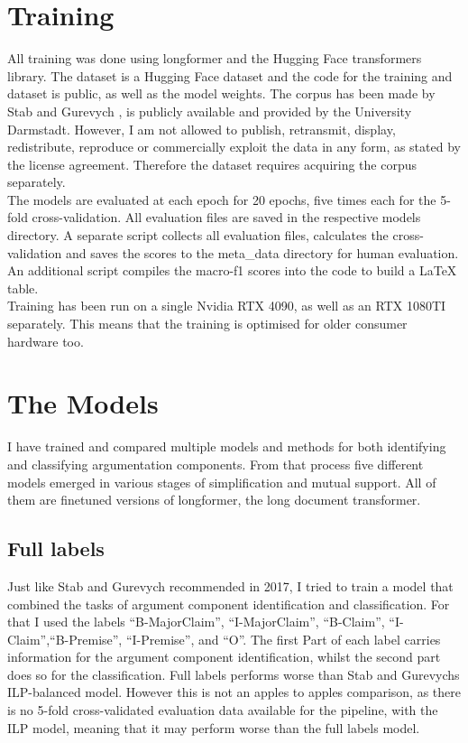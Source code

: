 \documentclass[12]{article}
\theoremstyle{mytheoremstyle}
\theoremstyle{mytheoremstyle}
\theoremstyle{myproblemstyle}
\begin{document}
  \section{Training\dotfill}
  All training was done using longformer\cite{beltagy2020longformer} and the Hugging Face transformers library. 
  The dataset is a Hugging Face dataset and the code for the training and dataset is public, as well as the model weights. 
  The corpus has been made by Stab and Gurevych \cite{stab-gurevych-2017-parsing}, is publicly available and provided by the University Darmstadt. 
  However, I am not allowed to publish, retransmit, display, redistribute, reproduce or commercially exploit the data in any form, as stated by the license agreement. 
  Therefore the dataset requires acquiring the corpus separately.\\
  The models are evaluated at each epoch for 20 epochs, five times each for the 5-fold cross-validation. 
  All evaluation files are saved in the respective models directory. 
  A separate script collects all evaluation files, calculates the cross-validation and saves the scores to the meta\_data directory for human evaluation. 
  An additional script compiles the macro-f1 scores into the code to build a LaTeX table.\\
  Training has been run on a single Nvidia RTX 4090, as well as an RTX 1080TI separately. This means that the training is optimised for older consumer hardware too.

  \section{The Models}
  I have trained and compared multiple models and methods for both identifying and classifying argumentation components. From that process five different models emerged in various stages of simplification and mutual support. All of them are finetuned versions of longformer\cite{beltagy2020longformer}, the long document transformer. 
  \subsection{Full labels} \label{full labels}
  Just like Stab and Gurevych recommended in 2017, I tried to train a model that combined the tasks of argument component identification and classification. For that I used the labels ``B-MajorClaim'', ``I-MajorClaim'', ``B-Claim'', ``I-Claim'',``B-Premise'', ``I-Premise'', and ``O''. The first Part of each label carries information for the argument component identification, whilst the second part does so for the classification. Full labels performs worse than Stab and Gurevychs ILP-balanced model\cite{stab-gurevych-2017-parsing}. However this is not an apples to apples comparison, as there is no 5-fold cross-validated evaluation data available for the pipeline, with the ILP model, meaning that it may perform worse than the full labels model. 
\end{document}
